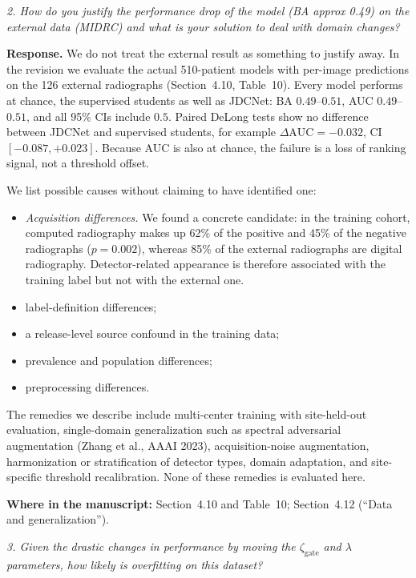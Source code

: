 \documentclass[11pt]{article}
\newenvironment{rcomment}{\par\noindent\begin{minipage}{\linewidth}\itshape\color{black!75}}{\end{minipage}\par}
\newcommand{\where}[1]{\par\noindent\textbf{Where in the manuscript:} #1\par}
\begin{document}
\begin{rcomment}
2. How do you justify the performance drop of the model (BA approx 0.49) on the external data (MIDRC) and what is your solution to deal with domain changes?
\end{rcomment}

\textbf{Response.} We do not treat the external result as something to justify
away. In the revision we evaluate the actual 510-patient models with per-image
predictions on the 126 external radiographs (Section~4.10, Table~10). Every
model performs at chance, the supervised students as well as JDCNet: BA
$0.49$--$0.51$, AUC $0.49$--$0.51$, and all 95\% CIs include $0.5$. Paired
DeLong tests show no difference between JDCNet and supervised students, for
example $\Delta\mathrm{AUC}=-0.032$, CI $[-0.087,+0.023]$. Because AUC is also
at chance, the failure is a loss of ranking signal, not a threshold offset.

We list possible causes without claiming to have identified one:
\begin{itemize}[leftmargin=1.4em]
  \item \emph{Acquisition differences.} We found a concrete candidate: in the training cohort, computed radiography makes up 62\% of the positive and 45\% of the negative radiographs ($p=0.002$), whereas 85\% of the external radiographs are digital radiography. Detector-related appearance is therefore associated with the training label but not with the external one.
  \item label-definition differences;
  \item a release-level source confound in the training data;
  \item prevalence and population differences;
  \item preprocessing differences.
\end{itemize}
The remedies we describe include multi-center training with site-held-out
evaluation, single-domain generalization such as spectral adversarial
augmentation (Zhang et al., AAAI 2023), acquisition-noise augmentation,
harmonization or stratification of detector types, domain adaptation, and
site-specific threshold recalibration. None of these remedies is evaluated
here.
\where{Section~4.10 and Table~10; Section~4.12 (``Data and generalization'').}

\begin{rcomment}
3. Given the drastic changes in performance by moving the $\zeta_{\mathrm{gate}}$ and $\lambda$ parameters, how likely is overfitting on this dataset?
\end{rcomment}
\end{document}
